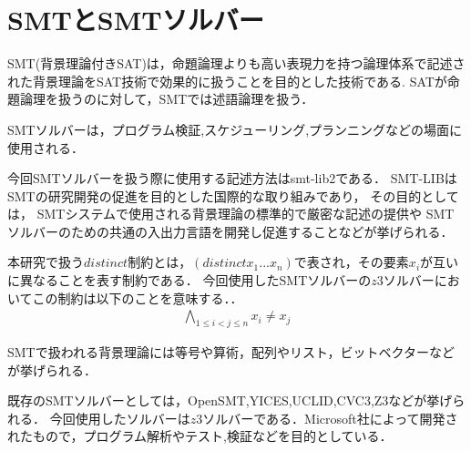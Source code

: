\chapter{SMTとSMTソルバー}\label{chap:smt}

%
%
SMT(背景理論付きSAT)は，命題論理よりも高い表現力を持つ論理体系で記述された背景理論をSAT技術で効果的に扱うことを目的とした技術である.
SATが命題論理を扱うのに対して，SMTでは述語論理を扱う．

%
%
SMTソルバーは，プログラム検証,スケジューリング,プランニングなどの場面に使用される．


今回SMTソルバーを扱う際に使用する記述方法はsmt-lib2である．
SMT-LIBはSMTの研究開発の促進を目的とした国際的な取り組みであり，
その目的としては，
SMTシステムで使用される背景理論の標準的で厳密な記述の提供や
SMTソルバーのための共通の入出力言語を開発し促進することなどが挙げられる．


本研究で扱う$distinct$制約とは，$(distinct x_1 ... x_n)$で表され，その要素$x_i$が互いに異なることを表す制約である．
今回使用したSMTソルバーの$z3ソルバー$においてこの制約は以下のことを意味する．．
\begin{eqnarray*}
    \bigwedge_{1 \leq i < j \leq n} x_i \neq x_j
\end{eqnarray*}


SMTで扱われる背景理論には等号や算術，配列やリスト，ビットベクターなどが挙げられる．

既存のSMTソルバーとしては，OpenSMT,YICES,UCLID,CVC3,Z3などが挙げられる．
今回使用したソルバーは$z3ソルバー$である．Microsoft社によって開発されたもので，プログラム解析やテスト,検証などを目的としている．



